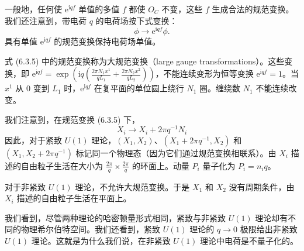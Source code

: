 一般地，任何使 $\mathrm{e}^{\mathrm{i} q f}$ 单值的多值 $f$ 都使 $O_C$ 不变，这些 $f$ 生成合法的规范变换。我们还注意到，带电荷 $q$ 的电荷场按下式变换：
\begin{equation*}
\phi \to \mathrm{e}^{\mathrm{i} q f} \phi.
\end{equation*}
具有单值 $\mathrm{e}^{\mathrm{i} q f}$ 的规范变换保持电荷场单值。

式 (6.3.5) 中的规范变换称为大规范变换（large gauge transformations）。这些变换，即 $\mathrm{e}^{\mathrm{i} q f} = \exp\!\left(\mathrm{i}q\left(\frac{2\pi N_1 x^1}{qL_1} + \frac{2\pi N_2 x^2}{qL_2}\right)\right)$，不能连续变形为恒等变换 $\mathrm{e}^{\mathrm{i} q f} = 1$。当 $x^1$ 从 0 变到 $L_1$ 时，$\mathrm{e}^{\mathrm{i} q f}$ 在复平面的单位圆上绕行 $N_1$ 圈。缠绕数 $N_1$ 不能连续改变。

我们注意到，在规范变换 (6.3.5) 下，
\begin{equation*}
X_i \to X_i + 2\pi q^{-1} N_i
\end{equation*}
因此，对于紧致 $U(1)$ 理论，$(X_1, X_2)$、$(X_1 + 2\pi q^{-1}, X_2)$ 和 $(X_1, X_2 + 2\pi q^{-1})$ 标记同一个物理态（因为它们通过规范变换相联系）。由 $X_i$ 描述的自由粒子生活在大小为 $\frac{2\pi}{q} \times \frac{2\pi}{q}$ 的环面上。动量 $P_i$ 量子化为 $P_i = n_i q$。

对于非紧致 $U(1)$ 理论，不允许大规范变换。于是 $X_1$ 和 $X_2$ 没有周期条件，由 $X_i$ 描述的自由粒子生活在平面上。

我们看到，尽管两种理论的哈密顿量形式相同，紧致与非紧致 $U(1)$ 理论却有不同的物理希尔伯特空间。我们还看到，紧致 $U(1)$ 理论的 $q \to 0$ 极限给出非紧致 $U(1)$ 理论。这就是为什么我们说，在非紧致 $U(1)$ 理论中电荷是不量子化的。


